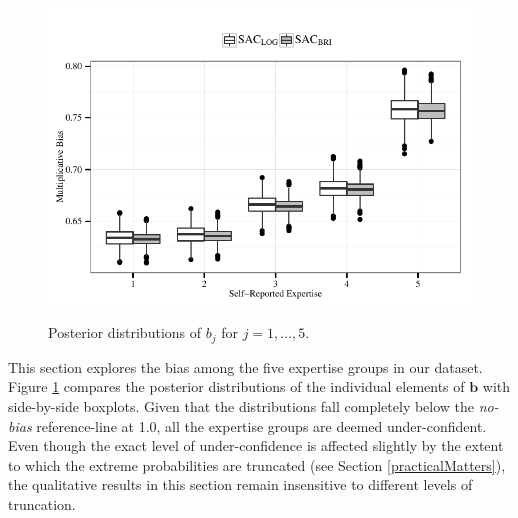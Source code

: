\documentclass[aoas, preprint]{imsart}
\numberwithin{equation}{section}
\theoremstyle{plain}
\begin{document}
\begin{figure}[!ht]
\vspace*{-1em} 
\includegraphics[width = \textwidth]{Figures/BiasesBoxplots}
\label{BiasesLOGBoxplots}
\vspace*{-2em} 

\caption[Optional caption for list of figures]{
Posterior distributions of $b_j$ for $j = 1, \dots, 5$.}
%
\label{Biases}
\end{figure}


This section explores the bias among the five expertise groups in our dataset. Figure \ref{Biases} compares the posterior distributions of the individual elements of $\boldsymbol{b}$ with side-by-side boxplots. Given that the distributions fall completely below the \textit{no-bias} reference-line at 1.0, all the expertise groups are deemed under-confident. Even though the exact level of under-confidence is affected slightly by the extent to which the extreme probabilities are truncated (see Section \ref{practicalMatters}), the qualitative results in this section remain insensitive to different levels of truncation. 
\end{document}
